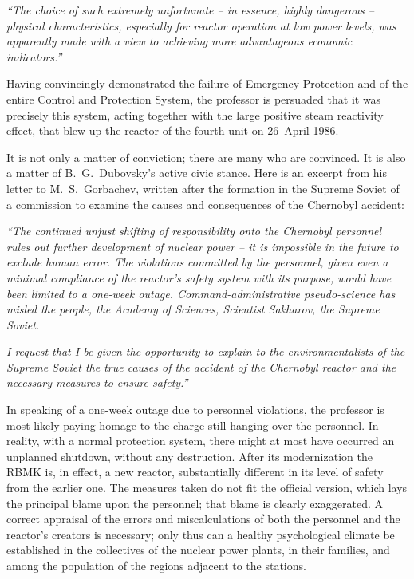 \documentclass[openright]{bookest}
\begin{document}
\begin{personal}
  \textit{``The choice of such extremely unfortunate -- in essence, highly dangerous -- physical characteristics, especially for reactor operation at low power levels, was apparently made with a view to achieving more advantageous economic indicators.''}
\end{personal}

Having convincingly demonstrated the failure of Emergency Protection and of the entire Control and Protection System, the professor is persuaded that it was precisely this system, acting together with the large positive steam reactivity effect, that blew up the reactor of the fourth unit on 26~April 1986.

It is not only a matter of conviction; there are many who are convinced. It is also a matter of B.~G.~Dubovsky's active civic stance. Here is an excerpt from his letter to M.~S.~Gorbachev, written after the formation in the Supreme Soviet of a commission to examine the causes and consequences of the Chernobyl accident:

\begin{personal}
\textit{``The continued unjust shifting of responsibility onto the Chernobyl personnel rules out further development of nuclear power -- it is impossible in the future to exclude human error. The violations committed by the personnel, given even a minimal compliance of the reactor's safety system with its purpose, would have been limited to a one-week outage. Command-administrative pseudo-science has misled the people, the Academy of Sciences, Scientist Sakharov, the Supreme Soviet.}

\textit{I request that I be given the opportunity to explain to the environmentalists of the Supreme Soviet the true causes of the accident of the Chernobyl reactor and the necessary measures to ensure safety.''}
\end{personal}

In speaking of a one-week outage due to personnel violations, the professor is most likely paying homage to the charge still hanging over the personnel. In reality, with a normal protection system, there might at most have occurred an unplanned shutdown, without any destruction. After its modernization the RBMK is, in effect, a new reactor, substantially different in its level of safety from the earlier one. The measures taken do not fit the official version, which lays the principal blame upon the personnel; that blame is clearly exaggerated. A correct appraisal of the errors and miscalculations of both the personnel and the reactor's creators is necessary; only thus can a healthy psychological climate be established in the collectives of the nuclear power plants, in their families, and among the population of the regions adjacent to the stations.
\end{document}
